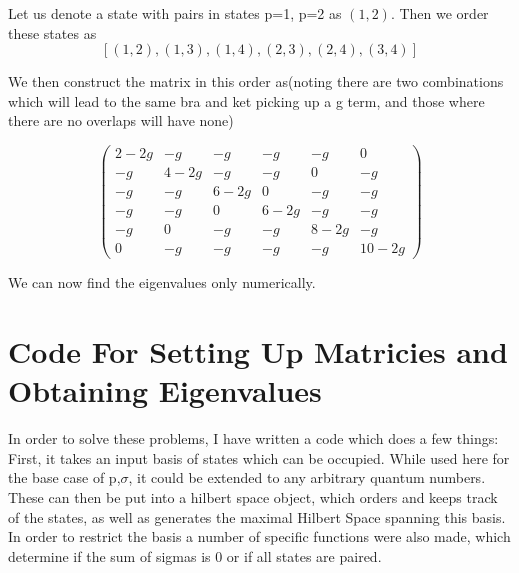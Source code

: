 \documentclass[11pt]{article} %
\begin{document}
Let us denote a state with pairs in states p=1, p=2 as $(1,2)$. Then we order these states as\\

\begin{equation}
\left[ (1,2), (1,3), (1,4), (2,3), (2,4), (3,4)\right]\end{equation}

We then construct the matrix in this order as(noting there are two combinations which will lead to the same bra and ket picking up a g term, and those where there are no overlaps will have none)

\begin{equation}\begin{pmatrix}
2-2g & -g & -g & -g & -g & 0\\
-g & 4-2g & -g & -g& 0 & -g\\
-g & -g & 6-2g & 0  & -g & -g \\
-g & -g & 0 & 6-2g & -g & -g\\
-g & 0 & -g & -g & 8-2g & -g\\
0& -g & -g & -g & -g & 10-2g
\end{pmatrix}
\end{equation}

We can now find the eigenvalues only numerically. 

\section{Code For Setting Up Matricies and Obtaining Eigenvalues}

In order to solve these problems, I have written a code which does a few things:
First, it takes an input basis of states which can be occupied. While used here for the base case of p,$\sigma$, it could be extended to any arbitrary quantum numbers. These can then be put into a hilbert space object, which orders and keeps track of the states, as well as generates the maximal Hilbert Space spanning this basis.\\

In order to restrict the basis a number of specific functions were also made, which determine if the sum of sigmas is 0 or if all states are paired. \\
\end{document}
